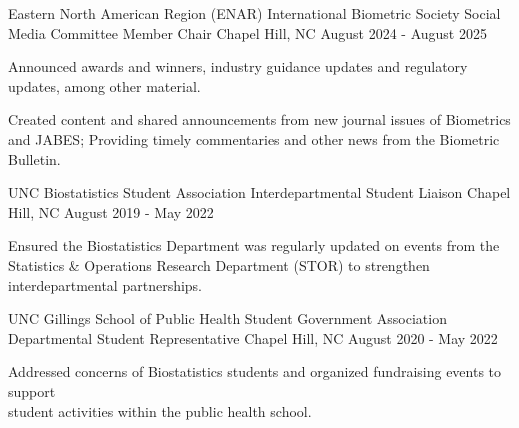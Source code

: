 \begin{cventries}
  \cventry
    {Eastern North American Region (ENAR) International Biometric Society} %
    {Social Media Committee Member Chair} %
    {Chapel Hill, NC} %
    {August 2024 - August 2025} %
    {
      \begin{cvitems} %
        \item Announced awards and winners, industry guidance updates and regulatory updates, among other material.
        \item Created content and shared announcements from new journal issues of Biometrics and JABES; Providing timely commentaries \newline and other news from the Biometric Bulletin.
      \end{cvitems}
    }
  \cventry
    {UNC Biostatistics Student Association} %
    {Interdepartmental Student Liaison} %
    {Chapel Hill, NC} %
    {August 2019 - May 2022} %
    {
      \begin{cvitems} %
        \item Ensured the Biostatistics Department was regularly updated on events from the \newline Statistics \& Operations Research Department (STOR) to strengthen interdepartmental partnerships.
      \end{cvitems}
    }

  \cventry
    {UNC Gillings School of Public Health Student Government Association} %
    {Departmental Student Representative} %
    {Chapel Hill, NC} %
    {August 2020 - May 2022} %
    {
      \begin{cvitems} %
        \item Addressed concerns of Biostatistics students and organized fundraising events to support \\ student activities within the public health school.
      \end{cvitems}
    }
    
    
\end{cventries}
